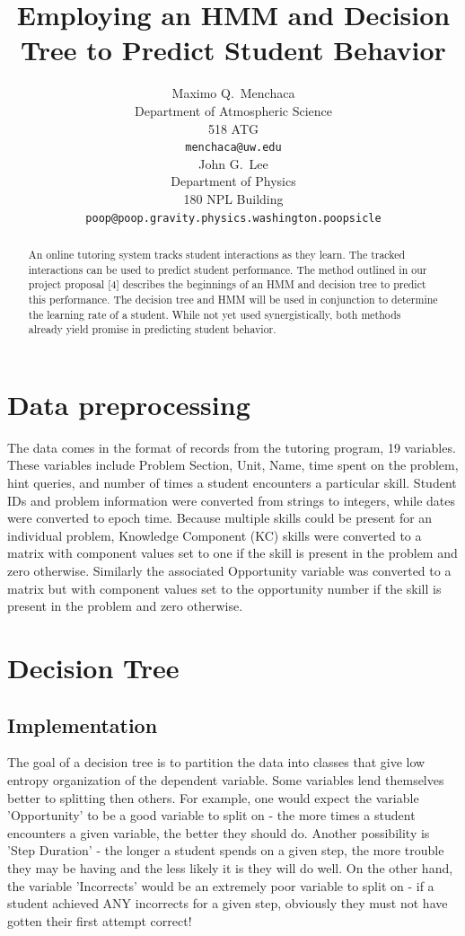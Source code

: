 \documentclass{article} %
\title{Employing an HMM and Decision Tree to Predict Student Behavior}
\author{
Maximo Q.~Menchaca\\
Department of Atmospheric Science\\
518 ATG\\
\texttt{menchaca@uw.edu} \\
\And
John G.~Lee\\
Department of Physics \\
180 NPL Building \\
\texttt{poop@poop.gravity.physics.washington.poopsicle} \\
}
\begin{document}
\maketitle

\begin{abstract}
An online tutoring system tracks student interactions as they learn. The tracked interactions can be used to predict student performance. The method outlined in our project proposal [4] describes the beginnings of an HMM and decision tree to predict this performance. The decision tree and HMM will be used in conjunction to determine the learning rate of a student. While not yet used synergistically, both methods already yield promise in predicting student behavior.

\end{abstract}

\section{Data preprocessing}
The data comes in the format of records from the tutoring program, 19 variables. These variables include Problem Section, Unit, Name, time spent on the problem, hint queries, and number of times a student encounters a particular skill. Student IDs and problem information were converted from strings to integers, while dates were converted to epoch time. Because multiple skills could be present for an individual problem, Knowledge Component (KC) skills were converted to a matrix with component values set to one if the skill is present in the problem and zero otherwise. Similarly the associated Opportunity variable was converted to a matrix but with component values set to the opportunity number if the skill is present in the problem and zero otherwise.

\section{Decision Tree}
\subsection{Implementation}
The goal of a decision tree is to partition the data into classes that give low entropy organization of the dependent variable. Some variables lend themselves better to splitting then others. For example, one would expect the variable 'Opportunity' to be a good variable to split on - the more times a student encounters a given variable, the better they should do. Another possibility is 'Step Duration' - the longer a student spends on a given step, the more trouble they may be having and the less likely it is they will do well. On the other hand, the variable 'Incorrects' would be an extremely poor variable to split on - if a student achieved ANY incorrects for a given step, obviously they must not have gotten their first attempt correct!
\end{document}
